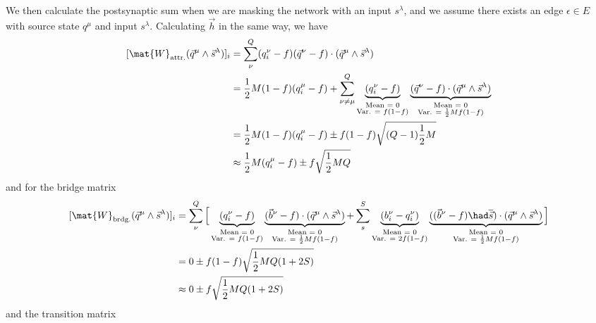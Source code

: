 We then calculate the postsynaptic sum when we are masking the network with an input $s^\lambda$, and we assume there exists an edge $\epsilon \in E$ with source state $q^\mu$ and input $s^\lambda$. Calculating $\vec{h}$ in the same way, we have
\begin{equation}
\begin{split}
[\mat{W}_\text{attr.} (\vec{q}^\mu \land \vec{s}^\lambda)]_i & = \sum_\nu^Q (q_i^\nu -f)(\vec{q}^\nu -f ) \cdot (\vec{q}^\mu \land \vec{s}^\lambda) \\
    & = \frac{1}{2}M(1-f)(q_i^\mu -f) + \sum_{\nu \neq \mu}^Q \underbrace{(q_i^\nu -f)}_{\substack{\text{Mean = 0} \\ \text{Var. = } f(1-f)}}\underbrace{(\vec{q}^\nu -f ) \cdot (\vec{q}^\mu \land \vec{s}^\lambda)}_{\substack{\text{Mean = 0} \\ \text{Var. = } \frac{1}{2}Mf(1-f)}} \\
    & =  \frac{1}{2} M(1-f)(q_i^\mu -f) \pm f(1-f)\sqrt{(Q-1)\frac{1}{2}M} \\
    & \approx  \frac{1}{2}M(q_i^\mu -f) \pm f\sqrt{\frac{1}{2}MQ}
\end{split}
\end{equation}
and for the bridge matrix
\begin{equation}
\begin{split}
    [\mat{W}_\text{brdg.} (\vec{q}^\mu \land \vec{s}^\lambda)]_i & = \sum_{\nu}^Q \Big[ \underbrace{(q_i^\nu -f)}_{\substack{\text{Mean = 0} \\ \text{Var. = } f(1-f)}}\underbrace{(\vec{b}^\nu -f ) \cdot (\vec{q}^\mu \land \vec{s}^\lambda)}_{\substack{\text{Mean = 0} \\ \text{Var. = } \frac{1}{2}Mf(1-f)}} + \sum_s^S \underbrace{(b_i^\nu -q_i^\nu)}_{\substack{\text{Mean = 0} \\ \text{Var. = } 2f(1-f)}}\underbrace{((\vec{b}^\nu -f) \had \overline{\vec{s}} ) \cdot (\vec{q}^\mu \land \vec{s}^\lambda)}_{\substack{\text{Mean = 0} \\ \text{Var. = } \frac{1}{2}Mf(1-f)}} \Big] \\
    & = 0 \pm f(1-f) \sqrt{\frac{1}{2}MQ(1+2S)} \\
    & \approx 0 \pm f \sqrt{\frac{1}{2}MQ(1+2S)} \\
\end{split}
\end{equation}
and the transition matrix
